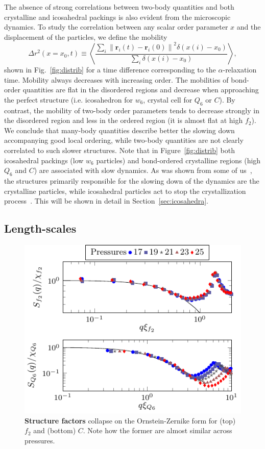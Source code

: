 \documentclass[twocolumn,superscriptaddress]{revtex4-1}
\begin{document}
The absence of strong correlations between two-body quantities and both crystalline and icosahedral packings is also evident from
the microscopic dynamics.
To study the correlation between any scalar order parameter $x$ and the displacement of the particles, we define the mobility 
\begin{equation}
	\Delta r^2(x=x_0, t) \equiv \left\langle \frac{
		\sum\limits_i{
			\left\|\mathbf{r}_i(t)-\mathbf{r}_i(0)\right\|^2 \delta(x(i)-x_0)
			}
	}{
		\sum\limits_i{\delta(x(i)-x_0)}
	}\right\rangle,
	\label{eq:mobility}
\end{equation}
shown in Fig.~\ref{fig:distrib} for a time difference corresponding to the $\alpha$-relaxation time. Mobility always decreases with increasing order. The mobilities of bond-order quantities are flat in the disordered regions and decrease when approaching the perfect structure (i.e. icosahedron for $w_6$, crystal cell for $Q_6$ or $C$). By contrast, the mobility of two-body order parameters tends to decrease strongly in the disordered region and less in the ordered region (it is almost flat at high $f_2$). We conclude that many-body quantities describe better the slowing down accompanying good local ordering, while two-body quantities are not clearly correlated to such slower structures.
Note that in Figure~\ref{fig:distrib} both icosahedral packings (low $w_6$ particles) and bond-ordered crystalline regions (high $Q_6$ and $C$) are associated with slow dynamics. As was shown from some of us~\cite{mathieu_icosahedra}, the structures primarily responsible for the slowing down of the dynamics are the crystalline particles, while icosahedral particles act to stop the crystallization process~\cite{russo_hs}.
This will be shown in detail in Section~\ref{sec:icosahedra}.


\subsection{Length-scales}\label{sec:lengths}
\begin{figure}
	\centering
	\includegraphics{fig_structurefactor}
	\caption{\textbf{Structure factors} collapse on the Ornstein-Zernike form for (top) $f_2$ and (bottom) $C$. Note how the former are almost similar across pressures.}
	\label{fig:structurefactor}
\end{figure}
\end{document}
